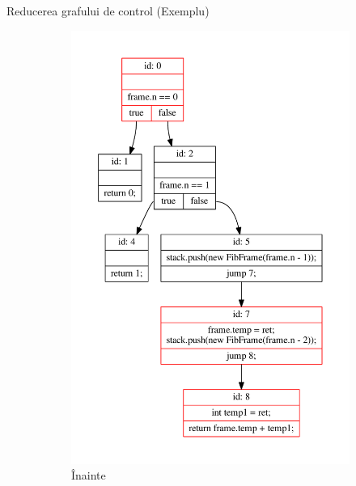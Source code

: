 \documentclass{beamer}
\begin{document}
\begin{frame}{Reducerea grafului de control (Exemplu)}
    \begin{figure}[htb]
        \begin{subfigure}[b]{.42\textwidth}
            \centering
            \includegraphics[width=\textwidth]{../../../theses/diploma/src/graph/inline-before.pdf}
            \caption{Înainte}
        \end{subfigure}
        \hfill
        \begin{subfigure}[b]{.42\textwidth}
            \centering

\end{subfigure}
\end{figure}
\end{frame}
\end{document}
